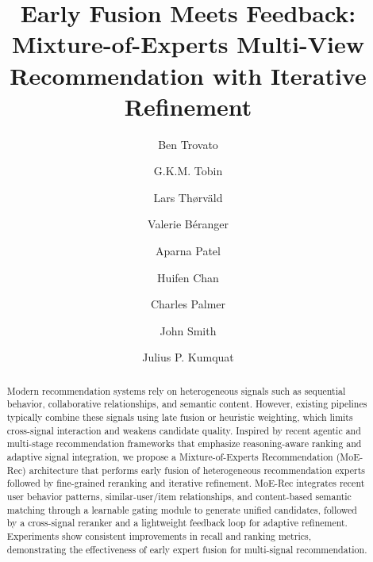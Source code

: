 \documentclass[sigconf,anonymous]{acmart}
\begin{document}
\title{Early Fusion Meets Feedback: Mixture-of-Experts Multi-View Recommendation with Iterative Refinement}

\author{Ben Trovato}
\author{G.K.M. Tobin}
\authornotemark[1]

\author{Lars Th{\o}rv{\"a}ld}

\author{Valerie B\'eranger}

\author{Aparna Patel}

\author{Huifen Chan}

\author{Charles Palmer}

\author{John Smith}

\author{Julius P. Kumquat}

\renewcommand{\shortauthors}{Trovato et al.}

\begin{abstract}
  Modern recommendation systems rely on heterogeneous signals such as sequential behavior, collaborative relationships, and semantic content. However, existing pipelines typically combine these signals using late fusion or heuristic weighting, which limits cross-signal interaction and weakens candidate quality. Inspired by recent agentic and multi-stage recommendation frameworks that emphasize reasoning-aware ranking and adaptive signal integration, we propose a Mixture-of-Experts Recommendation (MoE-Rec) architecture that performs early fusion of heterogeneous recommendation experts followed by fine-grained reranking and iterative refinement. MoE-Rec integrates recent user behavior patterns, similar-user/item relationships, and content-based semantic matching through a learnable gating module to generate unified candidates, followed by a cross-signal reranker and a lightweight feedback loop for adaptive refinement. Experiments show consistent improvements in recall and ranking metrics, demonstrating the effectiveness of early expert fusion for multi-signal recommendation.
\end{abstract}
\end{document}
